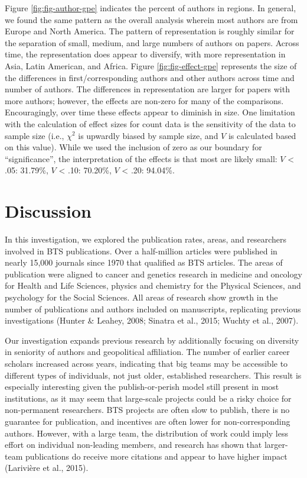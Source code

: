 \documentclass[
  man,mask,floatsintext]{apa7}
\begin{document}
Figure \ref{fig:fig-author-gpe} indicates the percent of authors in
regions. In general, we found the same pattern as the overall analysis
wherein most authors are from Europe and North America. The pattern of
representation is roughly similar for the separation of small, medium,
and large numbers of authors on papers. Across time, the representation
does appear to diversify, with more representation in Asia, Latin
American, and Africa. Figure \ref{fig:fig-effect-gpe} represents the
size of the differences in first/corresponding authors and other authors
across time and number of authors. The differences in representation are
larger for papers with more authors; however, the effects are non-zero
for many of the comparisons. Encouragingly, over time these effects
appear to diminish in size. One limitation with the calculation of
effect sizes for count data is the sensitivity of the data to sample
size (i.e., \(\chi^2\) is upwardly biased by sample size, and \(V\) is
calculated based on this value). While we used the inclusion of zero as
our boundary for ``significance'', the interpretation of the effects is
that most are likely small: \(V\) \textless{} .05:
31.79\%, \(V\) \textless{} .10:
70.20\%, \(V\) \textless{}
.20: 94.04\%.

\newpage

\hypertarget{discussion}{%
\section{Discussion}\label{discussion}}

In this investigation, we explored the publication rates, areas, and researchers involved in BTS publications. Over a half-million articles were published in nearly 15,000 journals since 1970 that qualified as BTS articles. The areas of publication were aligned to cancer and genetics research in medicine and oncology for Health and Life Sciences, physics and chemistry for the Physical Sciences, and psychology for the Social Sciences. All areas of research show growth in the number of publications and authors included on manuscripts, replicating previous investigations (Hunter \& Leahey, 2008; Sinatra et al., 2015; Wuchty et al., 2007).

Our investigation expands previous research by additionally focusing on diversity in seniority of authors and geopolitical affiliation. The number of earlier career scholars increased across years, indicating that big teams may be accessible to different types of individuals, not just older, established researchers. This result is especially interesting given the publish-or-perish model still present in most institutions, as it may seem that large-scale projects could be a risky choice for non-permanent researchers. BTS projects are often slow to publish, there is no guarantee for publication, and incentives are often lower for non-corresponding authors. However, with a large team, the distribution of work could imply less effort on individual non-leading members, and research has shown that larger-team publications do receive more citations and appear to have higher impact (Larivière et al., 2015).
\end{document}
